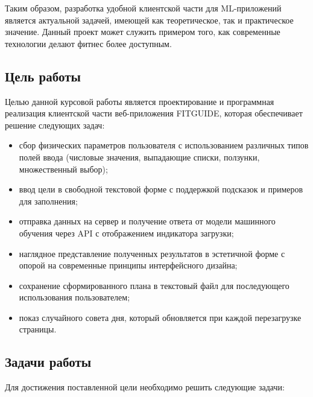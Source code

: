 \documentclass[14pt, a4paper]{extarticle}
\begin{document}
\medskip
\noindent Таким образом, разработка удобной клиентской части для ML-приложений является актуальной задачей, имеющей как теоретическое, так и практическое значение. Данный проект может служить примером того, как современные технологии делают фитнес более доступным.

\subsection*{Цель работы}

\noindent Целью данной курсовой работы является проектирование и программная реализация клиентской части веб-приложения FITGUIDE, которая обеспечивает решение следующих задач:
\begin{itemize}
\item сбор физических параметров пользователя с использованием различных типов полей ввода (числовые значения, выпадающие списки, ползунки, множественный выбор);
\item ввод цели в свободной текстовой форме с поддержкой подсказок и примеров для заполнения;
\item отправка данных на сервер и получение ответа от модели машинного обучения через API с отображением индикатора загрузки;
\item наглядное представление полученных результатов в эстетичной форме с опорой на современные принципы интерфейсного дизайна;
\item сохранение сформированного плана в текстовый файл для последующего использования пользователем;
\item показ случайного совета дня, который обновляется при каждой перезагрузке страницы.
\end{itemize}

\subsection*{Задачи работы}

\noindent Для достижения поставленной цели необходимо решить следующие задачи:
\end{document}
